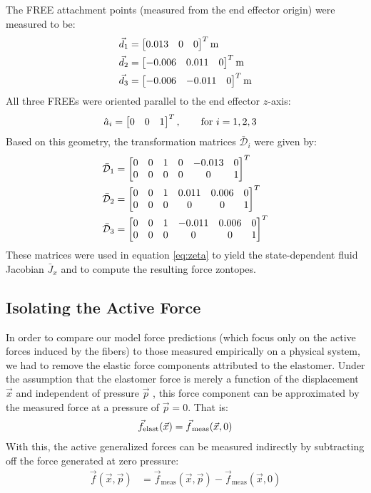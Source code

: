 The FREE attachment points (measured from the end effector origin) were measured to be:
\begin{align}
    \vec{d}_1 &= \begin{bmatrix} 0.013 & 0 & 0 \end{bmatrix}^T  \text{m}\\
    \vec{d}_2 &= \begin{bmatrix} -0.006 & 0.011 & 0 \end{bmatrix}^T  \text{m}\\
    \vec{d}_3 &= \begin{bmatrix} -0.006 & -0.011 & 0 \end{bmatrix}^T \text{m}
\end{align}
All three FREEs were oriented parallel to the end effector $z$-axis:
\begin{align}
    \hat{a}_i &= \begin{bmatrix} 0 & 0 & 1 \end{bmatrix}^T, \hspace{20pt} \text{for } i = 1,2,3
\end{align}
Based on this geometry, the transformation matrices $\bar{\mathcal{D}}_i$ were given by:
\begin{align}
    \bar{\mathcal{D}}_1 &= \begin{bmatrix} 0 & 0 & 1 & 0 & -0.013 & 0 \\ 0 & 0 & 0 & 0 & 0 & 1 \end{bmatrix}^T  \\
    \bar{\mathcal{D}}_2 &= \begin{bmatrix} 0 & 0 & 1 & 0.011 & 0.006 & 0 \\ 0 & 0 & 0 & 0 & 0 & 1 \end{bmatrix}^T  \\
    \bar{\mathcal{D}}_3 &= \begin{bmatrix} 0 & 0 & 1 & -0.011 & 0.006 & 0 \\ 0 & 0 & 0 & 0 & 0 & 1 \end{bmatrix}^T 
\end{align}
These matrices were used in equation \eqref{eq:zeta} to yield the state-dependent fluid Jacobian $\bar{J}_x$ and to compute the resulting force zontopes.



\subsection{Isolating the Active Force}
In order to compare our model force predictions (which focus only on the active forces induced by the fibers)
to those measured empirically on a physical system, we had to remove the elastic force components attributed to the elastomer. 
Under the assumption that the elastomer force is merely a function of the displacement $\vec{x}$ and independent of pressure $\vec{p}$ \cite{bruder2017model}, this force component can be approximated by the measured force at a pressure of $\vec{p}=0$. 
That is: 
\begin{align}
    \vec{f}_{\text{elast}} (\vec{x}) = \vec{f}_{\text{\,meas}} (\vec{x}, 0)
\end{align}
With this, the active generalized forces can be measured indirectly by subtracting off the force generated at zero pressure:
\begin{align}
    \vec{f} (\vec{x}, \vec{p})  &= \vec{f}_{\text{meas}} (\vec{x}, \vec{p}) - \vec{f}_{\text{meas}} (\vec{x}, 0)     \label{eq:fiberIso}
\end{align}


